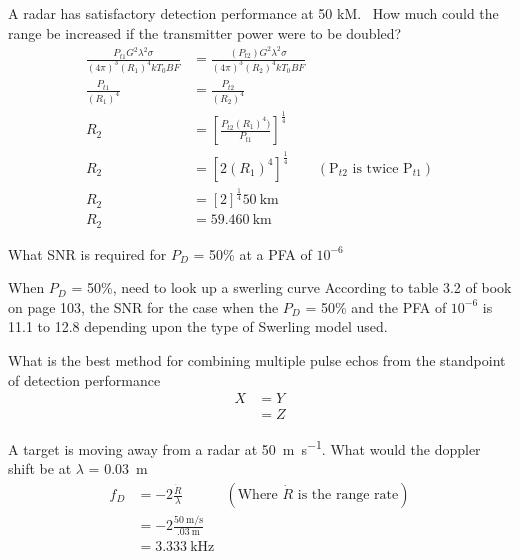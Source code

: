 \documentclass[12pt]{article}
\newenvironment{exercise}[2][Exercise]{\begin{trivlist}
    \item[\hskip \labelsep {\bfseries #1}\hskip \labelsep {\bfseries #2.}]}{\end{trivlist}}
\begin{document}
      \begin{exercise}{7}
      A radar has satisfactory detection performance at 50 kM.  How much could the range be increased if the transmitter power were to be doubled?
      \begin{align*}
      \frac{P_{t1}G^{2}\lambda^{2}\sigma}{(4\pi)^{3}(R_{1})^{4} k T_{0} B F} & = \frac{(P_{t2})G^{2}\lambda^{2}\sigma}{(4\pi)^{3}(R_{2})^{4} k T_{0} B F}\\
      \frac{P_{t1}}{(R_{1})^{4}} & = \frac{P_{t2}}{(R_{2})^{4}}\\
      R_{2} & = \left[\frac{P_{t2}(R_{1})^{4})}{P_{t1}}\right]^{\frac{1}{4}}\\
      R_{2} & = \left[2(R_{1})^{4}\right]^{\frac{1}{4}} & (\text{P$_{t2}$ is twice P$_{t1}$})\\
      R_{2} & = \left[2\right]^{\frac{1}{4}}\SI{50}{\km}\\
      R_{2} & = \SI{59.460}{\km}
      \end{align*}
      \end{exercise}
      
      \begin{exercise}{8}
      What SNR is required for $P_{D}$ = 50\% at a PFA of $10^{-6}$

      When $P_{D}$ = 50\%, need to look up a swerling curve
      According to table 3.2 of book on page 103, the SNR for the case when the $P_{D}$ = 50\% and the PFA of $10^{-6}$ is 11.1 to 12.8 depending upon the type of Swerling model used.
      \end{exercise}

      \begin{exercise}{9}
      What is the best method for combining multiple pulse echos from the standpoint of detection performance
      \begin{align*}
      X & = Y\\
      & = Z
      \end{align*}
      \end{exercise}
      
      \begin{exercise}{10}
      A target is moving away from a radar at \SI{50}{\meter\per\second}. What would the doppler shift be at $\lambda$ = \SI{.03}{\meter}
      \begin{align*}
      f_{D} & = -2\frac{\dot{R}}{\lambda} & (\text{Where $\dot{R}$ is the range rate})\\
      & = -2\frac{\SI{50}{\meter\per\second}}{\SI{.03}{\meter}}\\
      & = \SI{3.333}{\kHz}
      \end{align*}
      \end{exercise}
      
\end{document}
